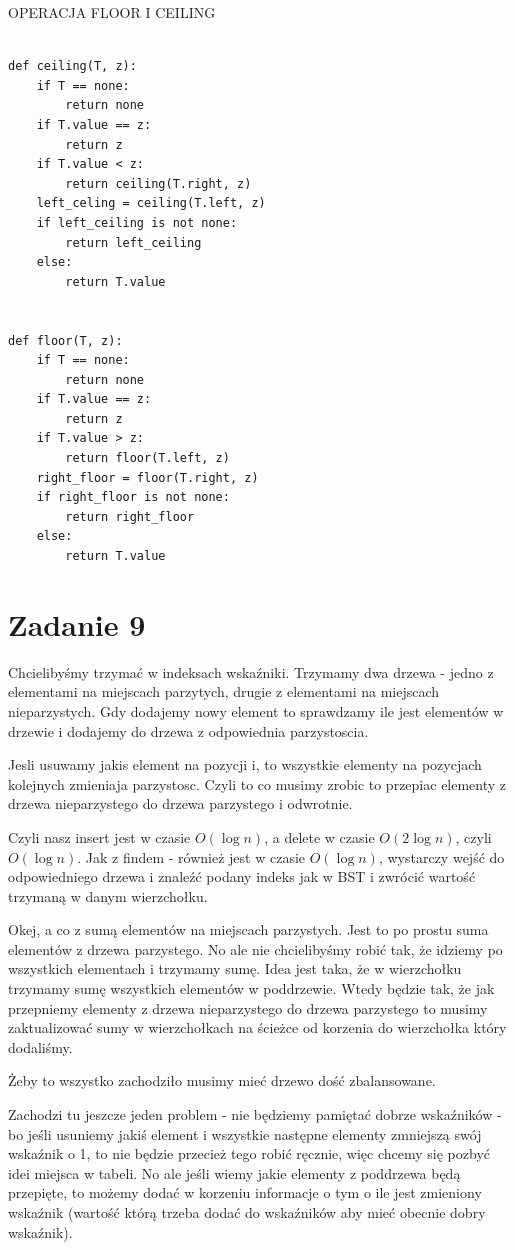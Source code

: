 \documentclass[12pt]{article}
\begin{document}
OPERACJA FLOOR I CEILING
\begin{lstlisting}

def ceiling(T, z):
    if T == none:
        return none 
    if T.value == z:
        return z 
    if T.value < z:
        return ceiling(T.right, z)
    left_celing = ceiling(T.left, z)
    if left_ceiling is not none:
        return left_ceiling
    else:
        return T.value 


def floor(T, z):
    if T == none:
        return none 
    if T.value == z:
        return z 
    if T.value > z:
        return floor(T.left, z)
    right_floor = floor(T.right, z)
    if right_floor is not none:
        return right_floor
    else:
        return T.value 
\end{lstlisting}


\section{Zadanie 9}
Chcielibyśmy trzymać w indeksach wskaźniki. Trzymamy dwa drzewa - jedno z elementami na miejscach parzytych, drugie z elementami na miejscach nieparzystych. Gdy dodajemy nowy element to sprawdzamy ile jest elementów w drzewie i dodajemy do drzewa z odpowiednia parzystoscia. 

Jesli usuwamy jakis element na pozycji i, to wszystkie elementy na pozycjach kolejnych zmieniaja parzystosc. 
Czyli to co musimy zrobic to przepiac elementy z drzewa nieparzystego do drzewa parzystego i odwrotnie.

Czyli nasz insert jest w czasie $O(\log n)$, a delete w czasie $O(2\log n)$, czyli $O(\log n)$.
Jak z findem - również jest w czasie $O(\log n)$, wystarczy wejść do odpowiedniego drzewa i znaleźć podany indeks jak w BST i zwrócić wartość trzymaną w danym wierzchołku.

Okej, a co z sumą elementów na miejscach parzystych. Jest to po prostu suma elementów z drzewa parzystego. No ale nie chcielibyśmy robić tak, że idziemy po wszystkich elementach i trzymamy sumę. Idea jest taka, że w wierzchołku trzymamy sumę wszystkich elementów w poddrzewie. 
Wtedy będzie tak, że jak przepniemy elementy z drzewa nieparzystego do drzewa parzystego to musimy zaktualizować sumy w wierzchołkach na ścieżce od korzenia do wierzchołka który dodaliśmy. 

Żeby to wszystko zachodziło musimy mieć drzewo dość zbalansowane.


Zachodzi tu jeszcze jeden problem - nie będziemy pamiętać dobrze wskaźników - bo jeśli usuniemy jakiś element i wszystkie następne elementy zmniejszą swój wskaźnik o 1, to nie będzie przecież tego robić ręcznie, więc chcemy się pozbyć idei miejsca w tabeli. No ale jeśli wiemy jakie elementy z poddrzewa będą przepięte, to możemy dodać w korzeniu informacje o tym o ile jest zmieniony wskaźnik (wartość którą trzeba dodać do wskaźników aby mieć obecnie dobry wskaźnik).
\end{document}
